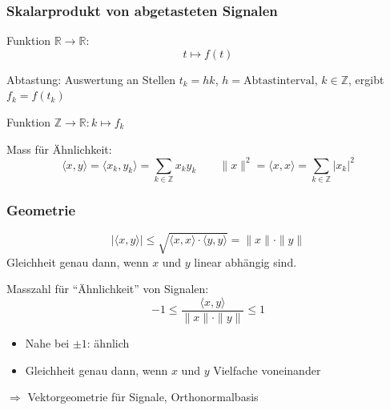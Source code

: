 
\begin{frame}
\frametitle{Skalarprodukt von abgetasteten Signalen}
\begin{signal}
Funktion $\mathbb R \to \mathbb R$:
\[
t\mapsto f(t)
\]
\end{signal}

Abtastung: Auswertung an Stellen $t_k = hk$, $h=\text{Abtastinterval}$,
$k\in\mathbb Z$, ergibt $f_k=f(t_k)$

\pause

\begin{abgetastet}
Funktion $\mathbb Z\to \mathbb R: k\mapsto f_k $
\end{abgetastet}

\pause

\begin{skalar}
Mass für Ähnlichkeit:
\[
\langle x,y\rangle
=
\langle x_k, y_k \rangle
=
\sum_{k\in\mathbb Z} x_ky_k
\qquad
\|x\|^2 = \langle x,x\rangle = \sum_{k\in\mathbb Z} |x_k|^2
\]
\end{skalar}

\end{frame}

%
%
\begin{frame}
\frametitle{Geometrie}
\begin{cauchyschwarz}
\[
|\langle x,y\rangle| \le \sqrt{\langle x,x\rangle \cdot \langle y,y\rangle}
= \|x\|\cdot \|y\|
\]
Gleichheit genau dann, wenn $x$ und $y$ linear abhängig sind.
\end{cauchyschwarz}

\pause
Masszahl für ``Ähnlichkeit'' von Signalen:
\[
-1 \le \frac{\langle x,y\rangle}{\|x\|\cdot \|y\|}\le 1
\]
\begin{itemize}
\item
Nahe bei $\pm 1$: ähnlich
\item
Gleichheit genau dann, wenn $x$ und $y$ Vielfache voneinander
\end{itemize}
$\Rightarrow$ Vektorgeometrie für Signale, Orthonormalbasis
\end{frame}

